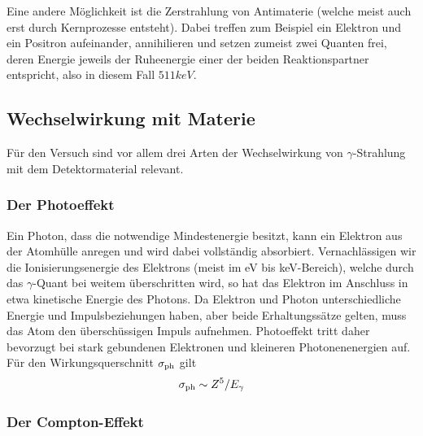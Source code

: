 		Eine andere Möglichkeit ist die Zerstrahlung von Antimaterie (welche meist auch erst durch Kernprozesse entsteht).
		Dabei treffen zum Beispiel ein Elektron und ein Positron aufeinander, annihilieren und setzen zumeist zwei Quanten frei, deren Energie jeweils der Ruheenergie einer der beiden Reaktionspartner entspricht, also in diesem Fall $511 \unit{keV}$.

	
	

	\subsection{Wechselwirkung mit Materie} %
	\label{sub:wechselwirkung_von_gammastrahlung_mit_materie}	
	
		Für den Versuch sind vor allem drei Arten der Wechselwirkung von $\gamma$-Strahlung mit dem Detektormaterial relevant.


		\subsubsection{Der Photoeffekt}
		\label{sssec:photoeffekt}
		
			Ein Photon, dass die notwendige Mindestenergie besitzt, kann ein Elektron aus der Atomhülle anregen und wird dabei vollständig absorbiert.
			Vernachlässigen wir die Ionisierungsenergie des Elektrons (meist im eV bis keV-Bereich), welche durch das $\gamma$-Quant bei weitem überschritten wird, so hat das Elektron im Anschluss in etwa kinetische Energie des Photons.
			Da Elektron und Photon unterschiedliche Energie und Impulsbeziehungen haben, aber beide Erhaltungssätze gelten, muss das Atom den überschüssigen Impuls aufnehmen.
			Photoeffekt tritt daher bevorzugt bei stark gebundenen Elektronen und kleineren Photonenenergien auf.
			Für den Wirkungsquerschnitt $\sigma_{\mathrm{ph}}$ gilt
			\[ \sigma_{\mathrm{ph}} \sim Z^5 / E_\gamma \]  
		


		\subsubsection{Der Compton-Effekt}
		\label{sssec:comptoneffekt}
		
